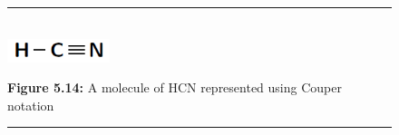     \setcounter{subfigure}{0}
	\begin{figure}[H] %
    \begin{center}
    \rule[.1in]{\figurerulewidth}{.005in} \\
        \label{m38701*uid22!!!underscore!!!media}\label{m38701*uid22!!!underscore!!!printimage}\includegraphics[width=3cm]{col11305.imgs/m38701_CG11C1_016.png} %
      \vspace{2pt}
    \vspace{\rubberspace}\par \begin{cnxcaption}
	  \small \textbf{Figure 5.14: }A molecule of $\mathrm{HCN}$ represented using Couper notation
	\end{cnxcaption}
    \vspace{.1in}
    \rule[.1in]{\figurerulewidth}{.005in} \\
    \end{center}
 \end{figure}       
\label{m38701*secfhsst!!!underscore!!!id327}
